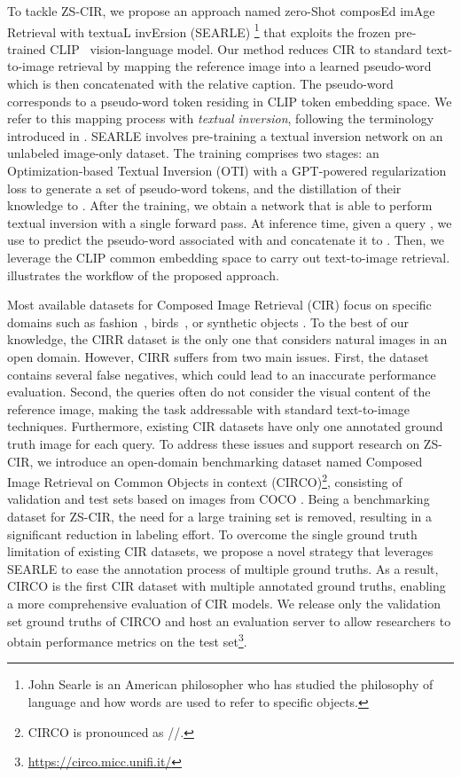 \documentclass[10pt,twocolumn,letterpaper]{article}
\newcommand{\method}{SEARLE\xspace}
\begin{document}
To tackle ZS-CIR, we propose an approach named zero-Shot composEd imAge Retrieval with textuaL invErsion (\method) \footnote{John Searle is an American philosopher who has studied the philosophy of language and how words are used to refer to specific objects.} that exploits the frozen pre-trained CLIP~\cite{radford2021learning} vision-language model. Our method reduces CIR to standard text-to-image retrieval by mapping the reference image into a learned pseudo-word which is then concatenated with the relative caption. The pseudo-word corresponds to a pseudo-word token residing in CLIP token embedding space. We refer to this mapping process with \textit{textual inversion}, following the terminology introduced in \cite{gal2022image}. \method involves pre-training a textual inversion network  on an unlabeled image-only dataset. The training comprises two stages: an Optimization-based Textual Inversion (OTI) with a GPT-powered regularization loss to generate a set of pseudo-word tokens, and the distillation of their knowledge to . After the training, we obtain a network  that is able to perform textual inversion with a single forward pass. At inference time, given a query , we use  to predict the pseudo-word associated with  and concatenate it to . Then, we leverage the CLIP common embedding space to carry out text-to-image retrieval.  illustrates the workflow of the proposed approach.

Most available datasets for Composed Image Retrieval (CIR) focus on specific domains such as fashion~\cite{berg2010automatic, han2017automatic, wu2021fashion, guo2018dialog}, birds~\cite{forbes2019neural}, or synthetic objects \cite{vo2019composing}. To the best of our knowledge, the CIRR dataset \cite{liu2021image} is the only one that considers natural images in an open domain. However, CIRR suffers from two main issues. First, the dataset contains several false negatives, which could lead to an inaccurate performance evaluation. Second, the queries often do not consider the visual content of the reference image, making the task addressable with standard text-to-image techniques. Furthermore, existing CIR datasets have only one annotated ground truth image for each query. To address these issues and support research on ZS-CIR, we introduce an open-domain benchmarking dataset named Composed Image Retrieval on Common Objects in context (CIRCO)\footnote{CIRCO is pronounced as //.}, consisting of validation and test sets based on images from COCO \cite{lin2014microsoft}. Being a benchmarking dataset for ZS-CIR, the need for a large training set is removed, resulting in a significant reduction in labeling effort. To overcome the single ground truth limitation of existing CIR datasets, we propose a novel strategy that leverages \method to ease the annotation process of multiple ground truths. As a result, CIRCO is the first CIR dataset with multiple annotated ground truths, enabling a more comprehensive evaluation of CIR models. We release only the validation set ground truths of CIRCO and host an evaluation server to allow researchers to obtain performance metrics on the test set\footnote{\href{https://circo.micc.unifi.it/}{\url{https://circo.micc.unifi.it/}}}.
\end{document}

